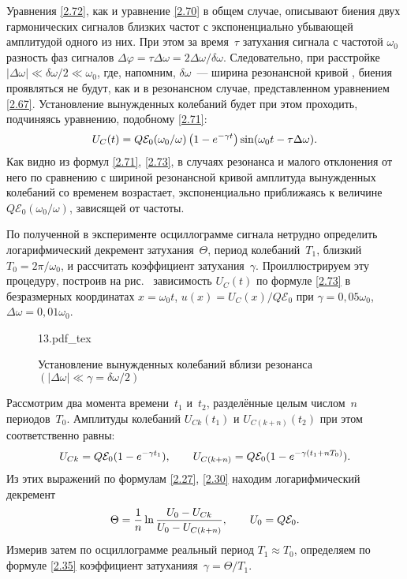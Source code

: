 \documentclass[a4paper,oneside]{book}
\begin{document}
Уравнения \eqref{2.72}, как и уравнение \eqref{2.70} в общем случае, описывают
биения двух гармонических сигналов близких частот с экспоненциально убывающей
амплитудой одного из них. При этом за время~$\tau$ затухания сигнала с частотой
$\omega_0$ разность фаз сигналов
$\Delta\varphi=\tau\Delta\omega=2\Delta\omega/\delta\omega$. Следовательно, при
расстройке $|\Delta\omega|\ll\delta\omega/2\ll\omega_0$, где, напомним,
$\delta\omega$~--- ширина резонансной кривой , биения
проявляться не будут, как и в резонансном случае, представленном уравнением
\eqref{2.67}. Установление вынужденных колебаний будет при этом проходить,
подчиняясь уравнению, подобному \eqref{2.71}:
\begin{equation}\eqmark{2.73}
	U_C(t)=Q\mathcal{E}_0(\omega_0/\omega)\left(1-e^{-\gamma
t}\right)\sin(\omega_0t-\tau\Delta\omega).
\end{equation}
Как видно из формул \eqref{2.71}, \eqref{2.73}, в случаях резонанса и малого
отклонения от него по сравнению с шириной резонансной кривой амплитуда
вынужденных колебаний со временем возрастает, экспоненциально приближаясь к величине $Q\mathcal{E}_0(\omega_0/\omega)$, зависящей от частоты.

По полученной в эксперименте осциллограмме сигнала нетрудно определить
логарифмический декремент затухания~$\Theta$, период колебаний~$T_1$, близкий
$T_0=2\pi/\omega_0$, и рассчитать коэффициент затухания~$\gamma$. Проиллюстрируем эту процедуру, построив на рис.~
зависимость $U_C(t)$ по формуле \eqref{2.73} в безразмерных координатах $x = \omega_0t$, $u(x) = U_C(x)/Q\mathcal{E}_0$ при $\gamma = 0,05\omega_0$, $\Delta \omega = 0,01\omega_0$.
\begin{figure}[h!]
	\centering
	{13.pdf_tex}
	\caption{Установление вынужденных колебаний вблизи резонанса
$(|\Delta\omega|\ll\gamma=\delta\omega/2)$}
\end{figure}
Рассмотрим два момента времени~$t_1$ и~$t_2$, разделённые целым числом~$n$
периодов~$T_0$. Амплитуды колебаний $U_{Ck}(t_1)$ и $U_{C(k+n)}(t_2)$ при этом
соответственно равны:
\begin{equation}\eqmark{2.74}
U_{Ck}=Q\mathcal{E}_0(1-e^{-\gamma t_1}), \qquad U_{C(k+n)}=Q\mathcal{E}_0(1-e^{-\gamma(t_1+nT_0)}).
\end{equation}
Из этих выражений по формулам \eqref{2.27}, \eqref{2.30} находим логарифмический декремент
\begin{equation}\eqmark{2.75}
\Theta=\dfrac{1}{n}\ln\dfrac{U_0-U_{Ck}}{U_0-U_{C(k+n)}}, \qquad U_0 = Q\mathcal{E}_0.
\end{equation}
Измерив затем по осциллограмме реальный период $T_1\approx T_0$, определяем по формуле \eqref{2.35} коэффициент затуханияя~$\gamma = \Theta/T_1$.
\end{document}
